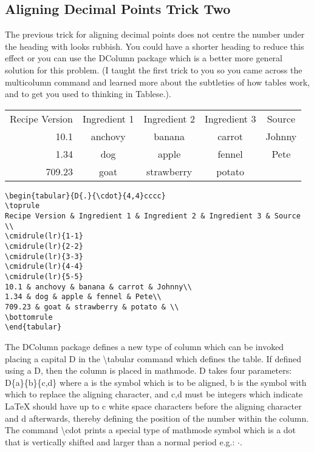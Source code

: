 \subsection{Aligning Decimal Points Trick Two}
The previous trick for aligning decimal points does not centre the number under the heading with looks rubbish. You could have a shorter heading to reduce this effect or you can use the DColumn package which is a better more general solution for this problem. (I taught the first trick to you so you came across the multicolumn command and learned more about the subtleties of how tables work, and to get you used to thinking in Tablese.).

\begin{center}
\begin{tabular}{D{.}{\cdot}{4,4}cccc}
\toprule
Recipe Version & Ingredient 1 & Ingredient 2 & Ingredient 3 & Source \\
\cmidrule(lr){1-1}
\cmidrule(lr){2-2}
\cmidrule(lr){3-3}
\cmidrule(lr){4-4}
\cmidrule(lr){5-5}
10.1 & anchovy & banana & carrot & Johnny\\
1.34 & dog & apple & fennel & Pete\\
709.23 & goat & strawberry & potato & \\
\bottomrule
\end{tabular}

\vspace*{2ex}

\begin{verbatim}
\begin{tabular}{D{.}{\cdot}{4,4}cccc}
\toprule
Recipe Version & Ingredient 1 & Ingredient 2 & Ingredient 3 & Source \\
\cmidrule(lr){1-1}
\cmidrule(lr){2-2}
\cmidrule(lr){3-3}
\cmidrule(lr){4-4}
\cmidrule(lr){5-5}
10.1 & anchovy & banana & carrot & Johnny\\
1.34 & dog & apple & fennel & Pete\\
709.23 & goat & strawberry & potato & \\
\bottomrule
\end{tabular}
\end{verbatim}
\end{center}

The DColumn package defines a new type of column which can be invoked placing a capital D in the {\textbackslash}tabular command which defines the table. If defined using a D, then the column is placed in mathmode. D takes four parameters: D\{a\}\{b\}\{c,d\} where a is the symbol which is to be aligned, b is the symbol with which to replace the aligning character, and {c,d} must be integers which indicate LaTeX should have up to c white space characters before the aligning character and d afterwards, thereby defining the position of the number within the column. The command {\textbackslash}cdot prints a special type of mathmode symbol which is a dot that is vertically shifted and larger than a normal period e.g.: $\cdot$. 

